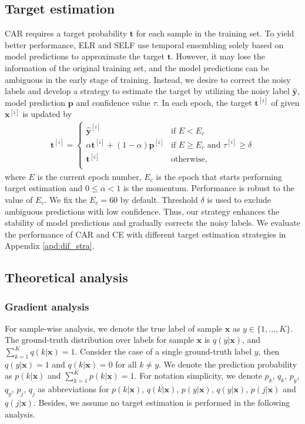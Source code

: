 \documentclass{article}
\begin{document}
\subsection{Target estimation}
\label{sec:target}
CAR requires a target probability $\bm{t}$ for each sample in the training set. To yield better performance, ELR \cite{liu2020early} and SELF \cite{nguyen2020self} use temporal ensembling \cite{laine2016temporal} solely based on model predictions to approximate the target $\bm{t}$. However, it may lose the information of the original training set, and the model predictions can be ambiguous in the early stage of training. Instead, we desire to correct the noisy labels and develop a strategy to estimate the target by utilizing the noisy label $\bm{\hat{y}}$, model prediction $\bm{p}$ and confidence value $\tau$. In each epoch, the target $\bm{t}^{[i]}$ of given $\bm{x}^{[i]}$ is updated by
\begin{align}
	\bm{t}^{[i]}=\left\{ \begin{array}{ll}
		\bm{\hat{y}}^{[i]} & \textrm{if } E < E_{c}\\
		\alpha \bm{t}^{[i]} + (1-\alpha) \bm{p}^{[i]} & \textrm{if $E \ge E_{c}$ and $\tau^{[i]} \ge \delta$}  \\
		\bm{t}^{[i]} & \textrm{otherwise},\\
	\end{array} \right. 
\end{align}
where $E$ is the current epoch number, $E_{c}$ is the epoch that starts performing target estimation and $0 \le \alpha < 1$ is the momentum. Performance is robust to the value of $E_{c}$. We fix the $E_{c}=60$ by default. Threshold $\delta$ is used to exclude ambiguous predictions with low confidence. Thus, our strategy enhances the stability of model predictions and gradually corrects the noisy labels. We evaluate the performance of CAR and CE with different target estimation strategies in Appendix \ref{apd:dif_stra}.





\subsection{Theoretical analysis}
\label{sec:theore}

\subsubsection{Gradient analysis}
\label{sec:grad_analysis}
For sample-wise analysis, we denote the true label of sample $\bm{x}$ as $y \in\{1,...,K\}$. The ground-truth distribution over labels for sample $\bm{x}$ is $q(y|\bm{x})$, and $\sum_{k=1}^{K}q(k|\bm{x})=1$. Consider the case of a single ground-truth label $y$, then $q(y|\bm{x})=1$ and $q(k|\bm{x})=0$ for all $k\ne y$. We denote the prediction probability as $p(k|\bm{x})$ and $\sum_{k=1}^{K}p(k|\bm{x})=1$. For notation simplicity, we denote $p_{k}$, $q_{k}$, $p_{y}$, $q_{y}$, $p_{j}$, $q_{j}$ as abbreviations for $p(k|\bm{x})$, $q(k|\bm{x})$, $p(y|\bm{x})$, $q(y|\bm{x})$, $p(j|\bm{x})$ and $q(j|\bm{x})$. Besides, we assume no target estimation is performed in the following analysis.
\end{document}
